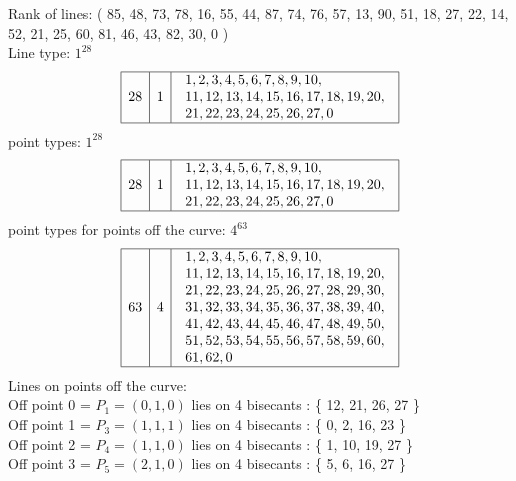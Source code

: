 \documentclass{article}
\begin{document}
{Rank of lines: ( 85, 48, 73, 78, 16, 55, 44, 87, 74, 76, 57, 13, 90, 51, 18, 27, 22, 14, 52, 21, 25, 60, 81, 46, 43, 82, 30, 0 )\\
Line type: $
1^{28}$\\
$$
\begin{array}{|r|r|l|}
\hline
28 & 1 & \begin{array}{l}
1, 2, 3, 4, 5, 6, 7, 8, 9, 10, \\
11, 12, 13, 14, 15, 16, 17, 18, 19, 20, \\
21, 22, 23, 24, 25, 26, 27, 0\end{array}
\\
\hline
\end{array}
$$
point types: $
1^{28}$\\
$$
\begin{array}{|r|r|l|}
\hline
28 & 1 & \begin{array}{l}
1, 2, 3, 4, 5, 6, 7, 8, 9, 10, \\
11, 12, 13, 14, 15, 16, 17, 18, 19, 20, \\
21, 22, 23, 24, 25, 26, 27, 0\end{array}
\\
\hline
\end{array}
$$
point types for points off the curve: $
4^{63}$\\
$$
\begin{array}{|r|r|l|}
\hline
63 & 4 & \begin{array}{l}
1, 2, 3, 4, 5, 6, 7, 8, 9, 10, \\
11, 12, 13, 14, 15, 16, 17, 18, 19, 20, \\
21, 22, 23, 24, 25, 26, 27, 28, 29, 30, \\
31, 32, 33, 34, 35, 36, 37, 38, 39, 40, \\
41, 42, 43, 44, 45, 46, 47, 48, 49, 50, \\
51, 52, 53, 54, 55, 56, 57, 58, 59, 60, \\
61, 62, 0\end{array}
\\
\hline
\end{array}
$$
Lines on points off the curve:\\
Off point 0 = $P_{1} = ( 0, 1, 0 )$ lies on 4 bisecants : \{ 12, 21, 26, 27 \}\\
Off point 1 = $P_{3} = ( 1, 1, 1 )$ lies on 4 bisecants : \{ 0, 2, 16, 23 \}\\
Off point 2 = $P_{4} = ( 1, 1, 0 )$ lies on 4 bisecants : \{ 1, 10, 19, 27 \}\\
Off point 3 = $P_{5} = ( 2, 1, 0 )$ lies on 4 bisecants : \{ 5, 6, 16, 27 \}\\
}
\end{document}
